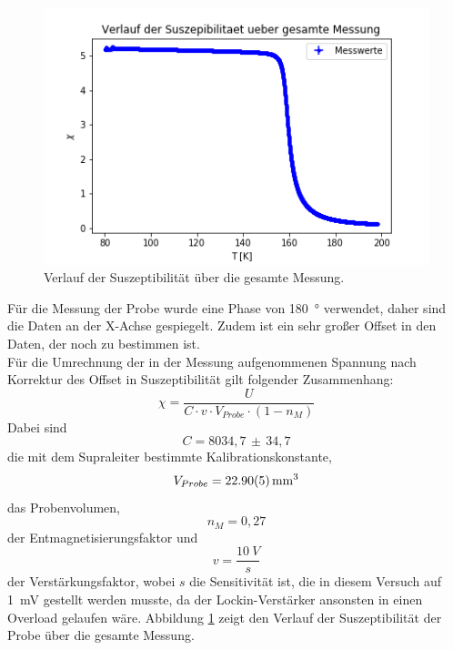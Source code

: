 \documentclass[12pt,a4paper]{article}
\begin{document}
\begin{figure}
\centering
\includegraphics[scale=1]{Bilder/Haupt_Probe/Suszeptibilitaet_Verlauf.png}
\caption[test]{Verlauf der Suszeptibilität über die gesamte Messung.}
\label{fig:Suszeptibilitaet_Verlauf}
\end{figure}

Für die Messung der Probe wurde eine Phase von \SI{180}{\degree} verwendet, daher sind die Daten an der X-Achse gespiegelt. Zudem ist ein sehr großer Offset in den Daten, der noch zu bestimmen ist. \\
Für die Umrechnung der in der Messung aufgenommenen Spannung nach Korrektur des Offset in Suszeptibilität gilt folgender Zusammenhang:
\begin{equation*}
\chi = \dfrac{U}{C \cdot v \cdot V_{Probe} \cdot (1-n_M)}
\end{equation*}
Dabei sind
\begin{equation*}
C = 8034,7 \, \pm \, 34,7
\end{equation*}
die mit dem Supraleiter bestimmte Kalibrationskonstante, 
\begin{equation*}
V_{Probe} = \SI{22,90 \pm 0,05}{mm^3}
\end{equation*}
das Probenvolumen,
\begin{equation*}
n_M = 0,27
\end{equation*}
der Entmagnetisierungsfaktor und 
\begin{equation*}
v = \dfrac{\SI{10}{V}}{s}
\end{equation*}
der Verstärkungsfaktor, wobei $s$ die Sensitivität ist, die in diesem Versuch auf \SI{1}{mV} gestellt werden musste, da der Lockin-Verstärker ansonsten in einen Overload gelaufen wäre. Abbildung \ref{fig:Suszeptibilitaet_Verlauf} zeigt den Verlauf der Suszeptibilität der Probe über die gesamte Messung. 
\end{document}
